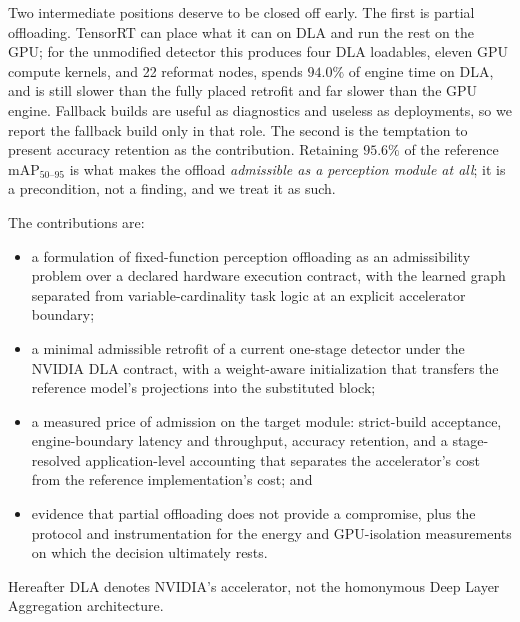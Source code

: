Two intermediate positions deserve to be closed off early. The first is partial
offloading. TensorRT can place what it can on DLA and run the rest on the GPU;
for the unmodified detector this produces four DLA loadables, eleven GPU compute
kernels, and 22 reformat nodes, spends $94.0\%$ of engine time on DLA, and is
still slower than the fully placed retrofit and far slower than the GPU engine.
Fallback builds are useful as diagnostics and useless as deployments, so we
report the fallback build only in that role. The second is the temptation to
present accuracy retention as the contribution. Retaining $95.6\%$ of the
reference $\mathrm{mAP}_{50\text{--}95}$ is what makes the offload
\emph{admissible as a perception module at all}; it is a precondition, not a
finding, and we treat it as such.

The contributions are:
\begin{itemize}
  \item a formulation of fixed-function perception offloading as an
  admissibility problem over a declared hardware execution contract, with the
  learned graph separated from variable-cardinality task logic at an explicit
  accelerator boundary;
  \item a minimal admissible retrofit of a current one-stage detector under the
  NVIDIA DLA contract, with a weight-aware initialization that transfers the
  reference model's projections into the substituted block;
  \item a measured price of admission on the target module: strict-build
  acceptance, engine-boundary latency and throughput, accuracy retention, and a
  stage-resolved application-level accounting that separates the accelerator's
  cost from the reference implementation's cost; and
  \item evidence that partial offloading does not provide a compromise, plus the
  protocol and instrumentation for the energy and GPU-isolation measurements on
  which the decision ultimately rests.
\end{itemize}

Hereafter DLA denotes NVIDIA's accelerator, not the homonymous Deep Layer
Aggregation architecture.
